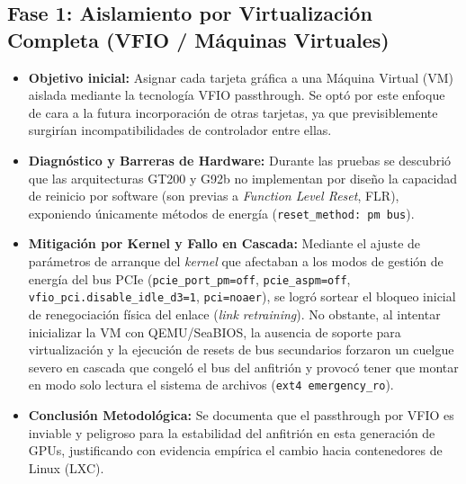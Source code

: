\documentclass[a4paper,11pt]{article}
\begin{document}
\subsection*{Fase 1: Aislamiento por Virtualización Completa (VFIO / Máquinas Virtuales)}
\begin{itemize}[leftmargin=*,itemsep=2pt]
    \item \textbf{Objetivo inicial:} Asignar cada tarjeta gráfica a una Máquina Virtual (VM) aislada mediante la tecnología VFIO passthrough. Se optó por este enfoque de cara a la futura incorporación de otras tarjetas, ya que previsiblemente surgirían incompatibilidades de controlador entre ellas.
    \item \textbf{Diagnóstico y Barreras de Hardware:} Durante las pruebas se descubrió que las arquitecturas GT200 y G92b no
    implementan por diseño la capacidad de reinicio por software (son previas a \textit{Function Level Reset}, FLR), exponiendo únicamente métodos de energía (\texttt{reset\_method: pm bus}).
    \item \textbf{Mitigación por Kernel y Fallo en Cascada:} Mediante el ajuste de parámetros de arranque del 
    \textit{kernel} que afectaban a los modos de gestión de energía del bus PCIe (\texttt{pcie\_port\_pm=off}, 
    \texttt{pcie\_aspm=off}, \texttt{vfio\_pci.disable\_idle\_d3=1},
     \texttt{pci=noaer}), se logró sortear el bloqueo inicial de renegociación física del enlace 
     (\textit{link retraining}). No obstante, al intentar inicializar la VM con QEMU/SeaBIOS, la ausencia de soporte 
     para virtualización y la ejecución de resets de bus secundarios forzaron un cuelgue severo en cascada que congeló 
     el bus del anfitrión y provocó tener que montar en modo solo lectura el sistema de archivos (\texttt{ext4 emergency\_ro}).
    \item \textbf{Conclusión Metodológica:} Se documenta que el passthrough por VFIO es inviable y peligroso para la 
    estabilidad del anfitrión en esta generación de GPUs, justificando con evidencia empírica el cambio hacia 
    contenedores de Linux (LXC).
\end{itemize}
\end{document}
